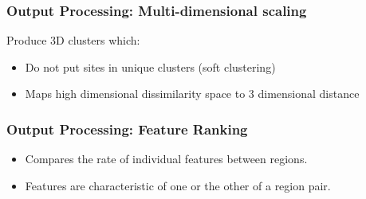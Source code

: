 \documentclass{beamer}
\begin{document}
\begin{frame}
  \frametitle{Output Processing: Multi-dimensional scaling}
  Produce 3D clusters which:
  \begin{itemize}
  \item Do not put sites in unique clusters (soft clustering)
  \item Maps high dimensional dissimilarity space to 3 dimensional distance
 \end{itemize}
\end{frame}
\begin{frame}
  \frametitle{Output Processing: Feature Ranking}
  \begin{itemize}
  \item Compares the rate of individual features between regions.
  \item Features are characteristic of one or the other of a region
    pair.
  \end{itemize}
\end{frame}
\end{document}
